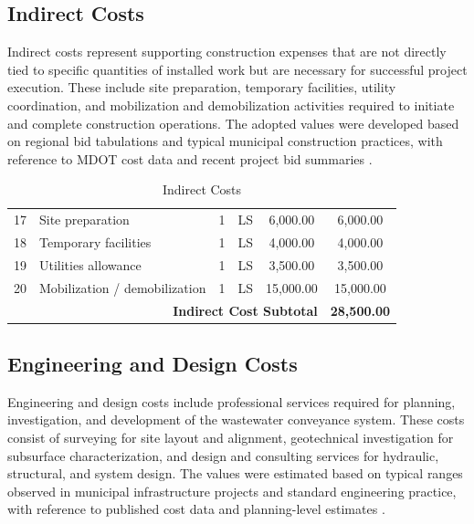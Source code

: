 \subsection{Indirect Costs}

Indirect costs represent supporting construction expenses that are not directly tied to specific quantities of installed work but are necessary for successful project execution. These include site preparation, temporary facilities, utility coordination, and mobilization and demobilization activities required to initiate and complete construction operations. The adopted values were developed based on regional bid tabulations and typical municipal construction practices, with reference to MDOT cost data and recent project bid summaries \cite{MDOT_BidTab_2024, CityMagnolia_BidTab_2024, CertifiedBidTab_Provided_2024}.


\begin{table}[H]
\centering
\caption{Indirect Costs}
\label{tab:indirect_costs}
\begin{tabular}{c l c c c c}
\toprule
17 & Site preparation              & 1 & LS & 6,000.00  & 6,000.00  \\
18 & Temporary facilities          & 1 & LS & 4,000.00  & 4,000.00  \\
19 & Utilities allowance           & 1 & LS & 3,500.00  & 3,500.00  \\
20 & Mobilization / demobilization & 1 & LS & 15,000.00 & 15,000.00 \\
\midrule
\multicolumn{5}{r}{\textbf{Indirect Cost Subtotal}} & \textbf{28,500.00} \\
\bottomrule
\end{tabular}
\end{table}


\subsection{Engineering and Design Costs}

Engineering and design costs include professional services required for planning, investigation, and development of the wastewater conveyance system. These costs consist of surveying for site layout and alignment, geotechnical investigation for subsurface characterization, and design and consulting services for hydraulic, structural, and system design. The values were estimated based on typical ranges observed in municipal infrastructure projects and standard engineering practice, with reference to published cost data and planning-level estimates \cite{CityClinton_ArrowDrive_2025, RSMeans_CostData_2025, FHWA_MajorProjectCostGuidance_2007}.


